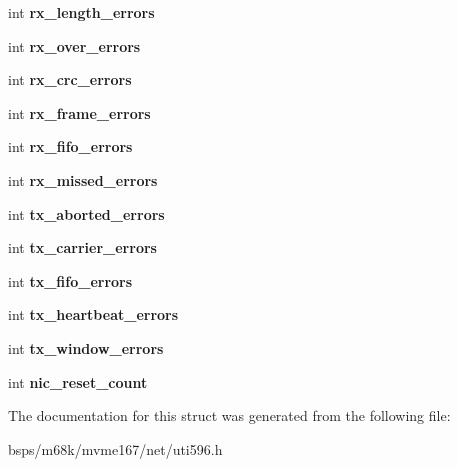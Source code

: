\begin{DoxyCompactItemize}
\mbox{\label{structenet__statistics_a732fb7668134a111e9e46459d6c8801b}} 
int {\bfseries rx\+\_\+length\+\_\+errors}
\item 
\mbox{\label{structenet__statistics_aaebebf77f2d8b262d088c91887332934}} 
int {\bfseries rx\+\_\+over\+\_\+errors}
\item 
\mbox{\label{structenet__statistics_a716ae7a2a5cc14d975fb85ca434bc7b0}} 
int {\bfseries rx\+\_\+crc\+\_\+errors}
\item 
\mbox{\label{structenet__statistics_afcab51442fb64c95b4219eece67eefa9}} 
int {\bfseries rx\+\_\+frame\+\_\+errors}
\item 
\mbox{\label{structenet__statistics_a59a79a98d7a8f18cbaa1798652b524de}} 
int {\bfseries rx\+\_\+fifo\+\_\+errors}
\item 
\mbox{\label{structenet__statistics_a28373b049e4c72d82e42645f281c579d}} 
int {\bfseries rx\+\_\+missed\+\_\+errors}
\item 
\mbox{\label{structenet__statistics_ae90410ef02b493d2f25d0ddc2f98e523}} 
int {\bfseries tx\+\_\+aborted\+\_\+errors}
\item 
\mbox{\label{structenet__statistics_afcc8101dd5d55ae6a180c3a901723025}} 
int {\bfseries tx\+\_\+carrier\+\_\+errors}
\item 
\mbox{\label{structenet__statistics_af84c1176c7303f176619b6d4870f15e9}} 
int {\bfseries tx\+\_\+fifo\+\_\+errors}
\item 
\mbox{\label{structenet__statistics_a9eed014015e42af801aa774ec02c727b}} 
int {\bfseries tx\+\_\+heartbeat\+\_\+errors}
\item 
\mbox{\label{structenet__statistics_a64cb902cbf3c7a97797005b26a1f18f0}} 
int {\bfseries tx\+\_\+window\+\_\+errors}
\item 
\mbox{\label{structenet__statistics_a60aa366101d8c785239db183dd33e06d}} 
int {\bfseries nic\+\_\+reset\+\_\+count}
\end{DoxyCompactItemize}


The documentation for this struct was generated from the following file\+:\begin{DoxyCompactItemize}
\item 
bsps/m68k/mvme167/net/uti596.\+h\end{DoxyCompactItemize}

